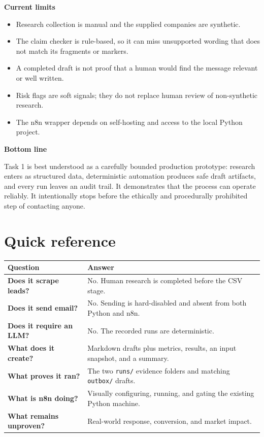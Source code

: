 \documentclass[11pt,a4paper]{article}
\newcommand{\pathcode}[1]{\texttt{#1}}
\begin{document}
\textbf{Current limits}
\begin{itemize}
  \item Research collection is manual and the supplied companies are synthetic.
  \item The claim checker is rule-based, so it can miss unsupported wording that does not match its fragments or markers.
  \item A completed draft is not proof that a human would find the message relevant or well written.
  \item Risk flags are soft signals; they do not replace human review of non-synthetic research.
  \item The n8n wrapper depends on self-hosting and access to the local Python project.
\end{itemize}

\textbf{Bottom line}

Task 1 is best understood as a carefully bounded production prototype: research enters as structured data, deterministic automation produces safe draft artifacts, and every run leaves an audit trail. It demonstrates that the process can operate reliably. It intentionally stops before the ethically and procedurally prohibited step of contacting anyone.

\section*{Quick reference}

\begin{tabularx}{\textwidth}{>{\bfseries}p{} X}
\toprule
Question & Answer \\
\midrule
Does it scrape leads? & No. Human research is completed before the CSV stage. \\
Does it send email? & No. Sending is hard-disabled and absent from both Python and n8n. \\
Does it require an LLM? & No. The recorded runs are deterministic. \\
What does it create? & Markdown drafts plus metrics, results, an input snapshot, and a summary. \\
What proves it ran? & The two \pathcode{runs/} evidence folders and matching \pathcode{outbox/} drafts. \\
What is n8n doing? & Visually configuring, running, and gating the existing Python machine. \\
What remains unproven? & Real-world response, conversion, and market impact. \\
\bottomrule
\end{tabularx}
\end{document}
